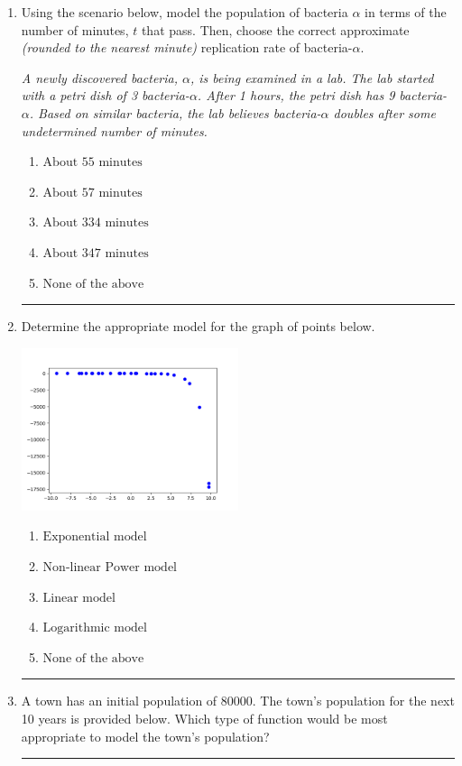 \documentclass[14pt]{extbook}
\newcommand{\litem}[1]{\item#1\hspace*{-1cm}\rule{\textwidth}{0.4pt}}
\begin{document}
\begin{enumerate}
{\begin{enumerate}[label=\Alph*.]
\end{enumerate} }
\litem{
Using the scenario below, model the population of bacteria $\alpha$ in terms of the number of minutes, $t$ that pass. Then, choose the correct approximate \textit{(rounded to the nearest minute)} replication rate of bacteria-$\alpha$.
\begin{center}
    \textit{ A newly discovered bacteria, $\alpha$, is being examined in a lab. The lab started with a petri dish of 3 bacteria-$\alpha$. After 1 hours, the petri dish has 9 bacteria-$\alpha$. Based on similar bacteria, the lab believes bacteria-$\alpha$ doubles after some undetermined number of minutes. }
\end{center}
\begin{enumerate}[label=\Alph*.]
\item \( \text{About } 55 \text{ minutes} \)
\item \( \text{About } 57 \text{ minutes} \)
\item \( \text{About } 334 \text{ minutes} \)
\item \( \text{About } 347 \text{ minutes} \)
\item \( \text{None of the above} \)

\end{enumerate} }
\litem{
Determine the appropriate model for the graph of points below.
\begin{center}
    \includegraphics[width=0.5\textwidth]{../Figures/identifyModelGraph11CopyC.png}
\end{center}
\begin{enumerate}[label=\Alph*.]
\item \( \text{Exponential model} \)
\item \( \text{Non-linear Power model} \)
\item \( \text{Linear model} \)
\item \( \text{Logarithmic model} \)
\item \( \text{None of the above} \)

\end{enumerate} }
\litem{
A town has an initial population of 80000. The town's population for the next 10 years is provided below. Which type of function would be most appropriate to model the town's population?

}
\end{enumerate}
\end{document}
